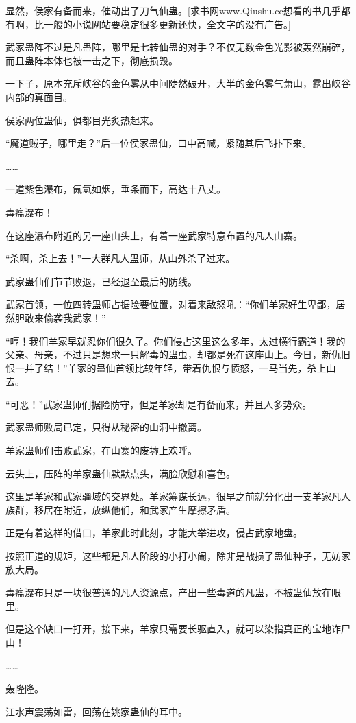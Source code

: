 \begin{this_body}
显然，侯家有备而来，催动出了刀气仙蛊。[求书网www.Qiushu.cc想看的书几乎都有啊，比一般的小说网站要稳定很多更新还快，全文字的没有广告。]

武家蛊阵不过是凡蛊阵，哪里是七转仙蛊的对手？不仅无数金色光影被轰然崩碎，而且蛊阵本体也被一击之下，彻底损毁。

一下子，原本充斥峡谷的金色雾从中间陡然破开，大半的金色雾气萧山，露出峡谷内部的真面目。

侯家两位蛊仙，俱都目光炙热起来。

“魔道贼子，哪里走？”后一位侯家蛊仙，口中高喊，紧随其后飞扑下来。

……

一道紫色瀑布，氤氲如烟，垂条而下，高达十八丈。

毒瘟瀑布！

在这座瀑布附近的另一座山头上，有着一座武家特意布置的凡人山寨。

“杀啊，杀上去！”一大群凡人蛊师，从山外杀了过来。

武家蛊仙们节节败退，已经退至最后的防线。

武家首领，一位四转蛊师占据险要位置，对着来敌怒吼：“你们羊家好生卑鄙，居然胆敢来偷袭我武家！”

“哼！我们羊家早就忍你们很久了。你们侵占这里这么多年，太过横行霸道！我的父亲、母亲，不过只是想求一只解毒的蛊虫，却都是死在这座山上。今日，新仇旧恨一并了结！”羊家的蛊仙首领比较年轻，带着仇恨与愤怒，一马当先，杀上山去。

“可恶！”武家蛊师们据险防守，但是羊家却是有备而来，并且人多势众。

武家蛊师败局已定，只得从秘密的山洞中撤离。

羊家蛊师们击败武家，在山寨的废墟上欢呼。

云头上，压阵的羊家蛊仙默默点头，满脸欣慰和喜色。

这里是羊家和武家疆域的交界处。羊家筹谋长远，很早之前就分化出一支羊家凡人族群，移居在附近，放纵他们，和武家产生摩擦矛盾。

正是有着这样的借口，羊家此时此刻，才能大举进攻，侵占武家地盘。

按照正道的规矩，这些都是凡人阶段的小打小闹，除非是战损了蛊仙种子，无妨家族大局。

毒瘟瀑布只是一块很普通的凡人资源点，产出一些毒道的凡蛊，不被蛊仙放在眼里。

但是这个缺口一打开，接下来，羊家只需要长驱直入，就可以染指真正的宝地诈尸山！

……

轰隆隆。

江水声震荡如雷，回荡在姚家蛊仙的耳中。


\end{this_body}
